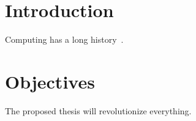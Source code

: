 \section*{Introduction}

Computing has a long history~\cite{vonneumann:45:edvac,vonneumann:annals93:edvac}.
\lipsum[2-4]


\section*{Objectives}

The proposed thesis will revolutionize everything.
\lipsum[5-6]
